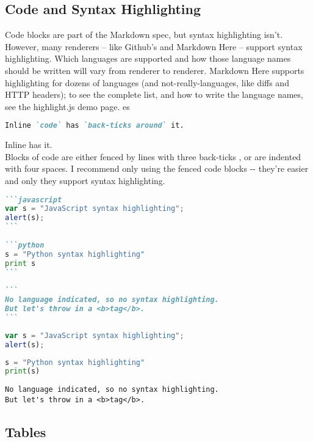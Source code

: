 \documentclass[a4paper, 11pt]{gfm}
\begin{document}
\subsection{Code and Syntax Highlighting}

Code blocks are part of the Markdown spec, but syntax highlighting isn't. However, many renderers -- like Github's and Markdown Here -- support syntax highlighting. Which languages are supported and how those language names should be written will vary from renderer to renderer. Markdown Here supports highlighting for dozens of languages (and not-really-languages, like diffs and HTTP headers); to see the complete list, and how to write the language names, see the highlight.js demo page.
es
\begin{lstlisting}[language=Markdown]
Inline `code` has `back-ticks around` it.
\end{lstlisting}

Inline  has  it. \\

Blocks of code are either fenced by lines with three back-ticks , or are indented with four spaces. I recommend only using the fenced code blocks -{-} they're easier and only they support syntax highlighting.

\begin{lstlisting}[language=Markdown]
```javascript
var s = "JavaScript syntax highlighting";
alert(s);
```
 
```python
s = "Python syntax highlighting"
print s
```
 
```
No language indicated, so no syntax highlighting. 
But let's throw in a <b>tag</b>.
```
\end{lstlisting}

\begin{lstlisting}[language=JavaScript]
var s = "JavaScript syntax highlighting";
alert(s);
\end{lstlisting}

\begin{lstlisting}[language=Python]
s = "Python syntax highlighting"
print(s)
\end{lstlisting}

\begin{lstlisting}
No language indicated, so no syntax highlighting. 
But let's throw in a <b>tag</b>.
\end{lstlisting}

\subsection{Tables}
\end{document}
